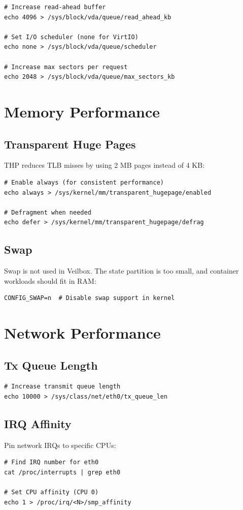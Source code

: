 \begin{lstlisting}
# Increase read-ahead buffer
echo 4096 > /sys/block/vda/queue/read_ahead_kb

# Set I/O scheduler (none for VirtIO)
echo none > /sys/block/vda/queue/scheduler

# Increase max sectors per request
echo 2048 > /sys/block/vda/queue/max_sectors_kb
\end{lstlisting}

\section{Memory Performance}

\subsection{Transparent Huge Pages}

THP reduces TLB misses by using 2 MB pages instead of 4 KB:

\begin{lstlisting}
# Enable always (for consistent performance)
echo always > /sys/kernel/mm/transparent_hugepage/enabled

# Defragment when needed
echo defer > /sys/kernel/mm/transparent_hugepage/defrag
\end{lstlisting}

\subsection{Swap}

Swap is not used in Veilbox. The state partition is too small, and
container workloads should fit in RAM:

\begin{lstlisting}
CONFIG_SWAP=n  # Disable swap support in kernel
\end{lstlisting}

\section{Network Performance}

\subsection{Tx Queue Length}

\begin{lstlisting}
# Increase transmit queue length
echo 10000 > /sys/class/net/eth0/tx_queue_len
\end{lstlisting}

\subsection{IRQ Affinity}

Pin network IRQs to specific CPUs:

\begin{lstlisting}
# Find IRQ number for eth0
cat /proc/interrupts | grep eth0

# Set CPU affinity (CPU 0)
echo 1 > /proc/irq/<N>/smp_affinity
\end{lstlisting}
